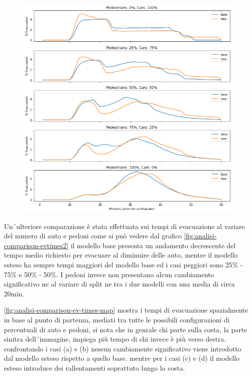 \begin{figure}
    \centering
    \includegraphics[width=\textwidth]{images/analisi/comparison-evtimes.png}
    \caption{}
    \label{fig:analisi-comparison-evtimes}
\end{figure}


Un´ulteriore comparazione è stata effettuata sui tempi di evacuazione al variare del numero di auto e pedoni
come si può vedere dal grafico \ref*{fig:analisi-comparison-evtimes2} il modello base presenta
un andamento decrescente del tempo medio richiesto per evacuare al diminuire delle auto, 
mentre il modello esteso ha sempre tempi maggiori del modello base ed i casi peggiori sono 25\% - 75\% e 50\% - 50\%.
I pedoni invece non presentano alcun cambiamento significativo ne al variare di split ne tra i due modelli con una media di circa 20min.

\ref*{fig:analisi-comparison-ev-times-map} mostra i tempi di evacuazione spazialmente in base al punto di partenza,
mediati tra tutte le possibili configurazioni di percentuali di auto e pedoni, si nota che in genrale chi parte sulla costa, la parte sinitra dell´immagine,
impiega più tempo di chi invece è più verso destra.
confrontando i casi (a) e (b) nessun cambiamente significativo viene introdotto dal modello esteso rispetto a quello base.
mentre per i casi (c) e (d) il modello esteso introduce dei rallentamenti soprattuto lungo la costa.

